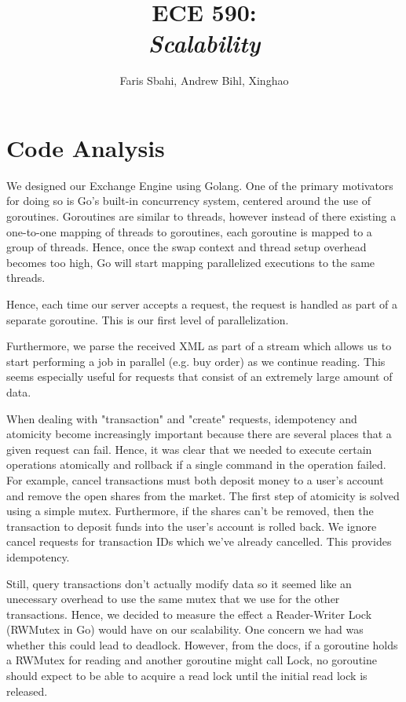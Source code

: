 \documentclass[titlepage, 11pt]{article}
\title{ECE 590: \\\textit{Scalability}}
\author{Faris Sbahi, Andrew Bihl, Xinghao}
\newcommand\0{\mathbf{0}}
\newcommand\<{\langle}
\renewcommand\>{\rangle}
\begin{document}
\maketitle

\section{Code Analysis}

We designed our Exchange Engine using Golang. One of the primary motivators for doing so is Go's built-in concurrency system, centered around the use of goroutines. Goroutines are similar to threads, however instead of there existing a one-to-one mapping of threads to goroutines, each goroutine is mapped to a group of threads. Hence, once the swap context and thread setup overhead becomes too high, Go will start mapping parallelized executions to the same threads.

Hence, each time our server accepts a request, the request is handled as part of a separate goroutine. This is our first level of parallelization. 

Furthermore, we parse the received XML as part of a stream which allows us to start performing a job in parallel (e.g. buy order) as we continue reading. This seems especially useful for requests that consist of an extremely large amount of data.

When dealing with "transaction" and "create" requests, idempotency and atomicity become increasingly important because there are several places that a given request can fail. Hence, it was clear that we needed to execute certain operations atomically and rollback if a single command in the operation failed. For example, cancel transactions must both deposit money to a user's account and remove the open shares from the market. The first step of atomicity is solved using a simple mutex. Furthermore, if the shares can't be removed, then the transaction to deposit funds into the user's account is rolled back. We ignore cancel requests for transaction IDs which we've already cancelled. This provides idempotency. 

Still, query transactions don't actually modify data so it seemed like an unecessary overhead to use the same mutex that we use for the other transactions. Hence, we decided to measure the effect a Reader-Writer Lock (RWMutex in Go) would have on our scalability. One concern we had was whether this could lead to deadlock. However, from the docs, if a goroutine holds a RWMutex for reading and another goroutine might call Lock, no goroutine should expect to be able to acquire a read lock until the initial read lock is released.
\end{document}
